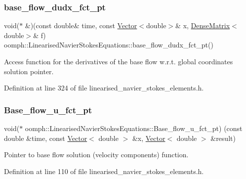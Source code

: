 \subsubsection{\texorpdfstring{base\+\_\+flow\+\_\+dudx\+\_\+fct\+\_\+pt}{base\_flow\_dudx\_fct\_pt}}
{\footnotesize\ttfamily void($\ast$ \&)(const double\& time, const \hyperlink{classoomph_1_1Vector}{Vector}$<$double$>$\& x, \hyperlink{classoomph_1_1DenseMatrix}{Dense\+Matrix}$<$double$>$\& f) oomph\+::\+Linearised\+Navier\+Stokes\+Equations\+::base\+\_\+flow\+\_\+dudx\+\_\+fct\+\_\+pt()\hspace{0.3cm}{\ttfamily [inline]}}



Access function for the derivatives of the base flow w.\+r.\+t. global coordinates solution pointer. 



Definition at line 324 of file linearised\+\_\+navier\+\_\+stokes\+\_\+elements.\+h.

\mbox{\label{classoomph_1_1LinearisedNavierStokesEquations_a9bacf9839ab562a2b52e8afc2b882e9d}} 
\subsubsection{\texorpdfstring{Base\+\_\+flow\+\_\+u\+\_\+fct\+\_\+pt}{Base\_flow\_u\_fct\_pt}}
{\footnotesize\ttfamily void($\ast$ oomph\+::\+Linearised\+Navier\+Stokes\+Equations\+::\+Base\+\_\+flow\+\_\+u\+\_\+fct\+\_\+pt) (const double \&time, const \hyperlink{classoomph_1_1Vector}{Vector}$<$ double $>$ \&x, \hyperlink{classoomph_1_1Vector}{Vector}$<$ double $>$ \&result)\hspace{0.3cm}{\ttfamily [protected]}}



Pointer to base flow solution (velocity components) function. 



Definition at line 110 of file linearised\+\_\+navier\+\_\+stokes\+\_\+elements.\+h.



